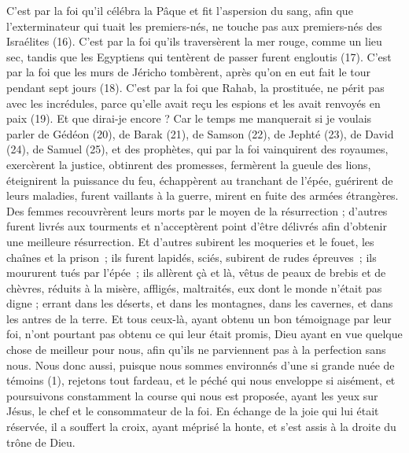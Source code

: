 \begin{multicols}{2}
C’est par la foi qu’il célébra la Pâque et fit l'aspersion du sang, afin que l’exterminateur qui tuait les premiers-nés, ne touche pas aux premiers-nés des Israélites (16).
C’est par la foi qu’ils traversèrent la mer rouge, comme un lieu sec, tandis que les Egyptiens qui tentèrent de passer furent engloutis (17).
C’est par la foi que les murs de Jéricho tombèrent, après qu'on en eut fait le tour pendant sept jours (18).
\TextTitle{[k. Rahab]}
C’est par la foi que Rahab, la prostituée, ne périt pas avec les incrédules, parce qu’elle avait reçu les espions et les avait renvoyés en paix (19).
Et que dirai-je encore ? Car le temps me manquerait si je voulais parler de Gédéon (20), de Barak (21), de Samson (22), de Jephté (23), de David (24), de Samuel (25), et des prophètes,
qui par la foi vainquirent des royaumes, exercèrent la justice, obtinrent des promesses, fermèrent la gueule des lions,
éteignirent la puissance du feu, échappèrent au tranchant de l’épée, guérirent de leurs maladies, furent vaillants à la guerre, mirent en fuite des armées étrangères.
Des femmes recouvrèrent leurs morts par le moyen de la résurrection ; d'autres furent livrés aux tourments et n’acceptèrent point d'être délivrés afin d'obtenir une meilleure résurrection.
Et d'autres subirent les moqueries et le fouet, les chaînes et la prison ;
ils furent lapidés, sciés, subirent de rudes épreuves ; ils moururent tués par l'épée ; ils allèrent çà et là, vêtus de peaux de brebis et de chèvres, réduits à la misère, affligés, maltraités,
eux dont le monde n'était pas digne ; errant dans les déserts, et dans les montagnes, dans les cavernes, et dans les antres de la terre.
Et tous ceux-là, ayant obtenu un bon témoignage par leur foi, n'ont pourtant pas obtenu ce qui leur était promis,
Dieu ayant en vue quelque chose de meilleur pour nous, afin qu'ils ne parviennent pas à la perfection sans nous.
\VerseOne{}Nous donc aussi, puisque nous sommes environnés d'une si grande nuée de témoins (1), rejetons tout fardeau, et le péché qui nous enveloppe si aisément, et poursuivons constamment la course qui nous est proposée,
ayant les yeux sur Jésus, le chef et le consommateur de la foi. En échange de la joie qui lui était réservée, il a souffert la croix, ayant méprisé la honte, et s'est assis à la droite du trône de Dieu.

\end{multicols}

